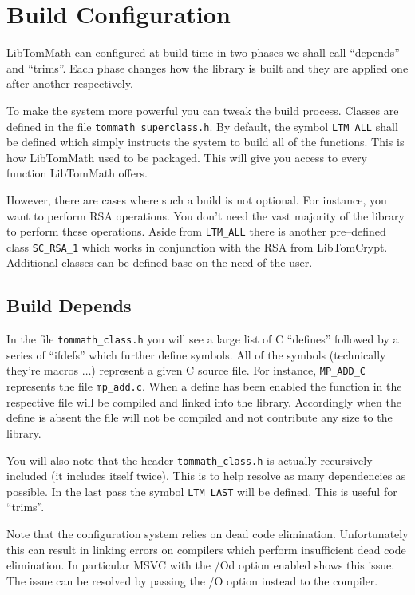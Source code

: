 \documentclass[synpaper]{book}
\begin{document}
\section{Build Configuration}
LibTomMath can configured at build time in two phases we shall call ``depends'' and
``trims''. Each phase changes how the library is built and they are applied one after another
respectively.

To make the system more powerful you can tweak the build process.  Classes are defined in the file
\texttt{tommath\_superclass.h}.  By default, the symbol \texttt{LTM\_ALL} shall be defined which
simply instructs the system to build all of the functions.  This is how LibTomMath used to be
packaged. This will give you access to every function LibTomMath offers.

However, there are cases where such a build is not optional.  For instance, you want to perform RSA
operations.  You don't need the vast majority of the library to perform these operations.  Aside
from \texttt{LTM\_ALL} there is another pre--defined class \texttt{SC\_RSA\_1} which works in
conjunction with the RSA from LibTomCrypt.  Additional classes can be defined base on the need of
the user.

\subsection{Build Depends}
In the file \texttt{tommath\_class.h} you will see a large list of C ``defines'' followed by a
series of ``ifdefs'' which further define symbols.  All of the symbols (technically they're macros
$\ldots$) represent a given C source file.  For instance, \texttt{MP\_ADD\_C} represents the file
\texttt{mp\_add.c}.  When a define has been enabled the function in the respective file will be
compiled and linked into the library.  Accordingly when the define is absent the file will not be
compiled and not contribute any size to the library.

You will also note that the header \texttt{tommath\_class.h} is actually recursively included (it
includes itself twice). This is to help resolve as many dependencies as possible.  In the last pass
the symbol \texttt{LTM\_LAST} will be defined. This is useful for ``trims''.

Note that the configuration system relies
on dead code elimination. Unfortunately this can result in linking errors on compilers which
perform insufficient dead code elimination. In particular MSVC with the /Od option enabled shows this issue.
The issue can be resolved by passing the /O option instead to the compiler.
\end{document}
